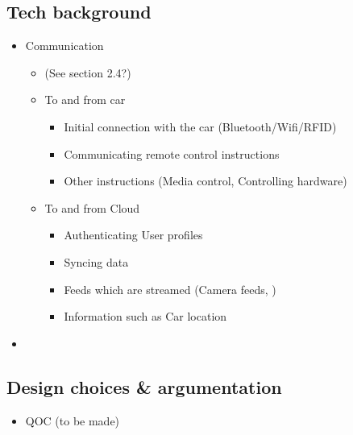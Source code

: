 \documentclass{article}
\begin{document}
\subsection{Tech background}
	\begin{itemize}
		\item Communication
        \begin{itemize}
        	\item (See section 2.4?)
        	\item To and from car
            \begin{itemize}
            	\item Initial connection with the car (Bluetooth/Wifi/RFID)
                \item Communicating remote control instructions
                \item Other instructions (Media control, Controlling hardware)
            \end{itemize}
            \item To and from Cloud
            \begin{itemize}
            	\item Authenticating User profiles
                \item Syncing data
                \item Feeds which are streamed (Camera feeds, )
                \item Information such as Car location
            \end{itemize}
        \end{itemize}
        \item 
	\end{itemize}
    
\subsection{Design choices \& argumentation}
  \begin{itemize}
    \item QOC (to be made)
  \end{itemize}
\end{document}
